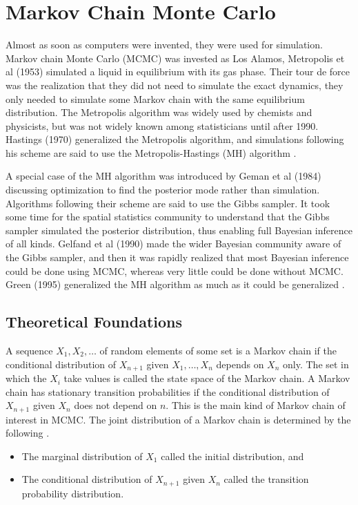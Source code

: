 \documentclass[../../../main.tex]{subfiles}
\begin{document}
\section{Markov Chain Monte Carlo}\label{Appendix:MCMC}

Almost as soon as computers were invented, they were used for simulation. Markov chain Monte Carlo (MCMC) was invested as Los Alamos, Metropolis et al (1953) simulated a liquid in equilibrium with its gas phase. Their tour de force was the realization that they did not need to simulate the exact dynamics, they only needed to simulate some Markov chain with the same equilibrium distribution. The Metropolis algorithm was widely used by chemists and physicists, but was not widely known among statisticians until after 1990. Hastings (1970) generalized the Metropolis algorithm, and simulations following his scheme are said to use the Metropolis-Hastings (MH) algorithm \autocite{Brooks2011}.

A special case of the MH algorithm was introduced by Geman et al (1984) discussing optimization to find the posterior mode rather than simulation. Algorithms following their scheme are said to use the Gibbs sampler. It took some time for the spatial statistics community to understand  that the Gibbs sampler simulated the posterior distribution, thus enabling full Bayesian inference of all kinds. Gelfand et al (1990) made the wider Bayesian community aware of the Gibbs sampler, and then it was rapidly realized that most Bayesian inference could be done using MCMC, whereas very little could be done without MCMC. Green (1995) generalized the MH algorithm as much as it could be generalized \autocite{Brooks2011}.

\subsection{Theoretical Foundations}

A sequence $X_1, X_2, \ldots$ of random elements of some set is a Markov chain if the conditional distribution of $X_{n+1}$ given $X_1,\ldots,X_n$ depends on $X_n$ only. The set in which the $X_i$ take values is called the state space of the Markov chain. A Markov chain has stationary transition probabilities if the conditional distribution of $X_{n+1}$ given $X_n$ does not depend on $n$. This is the main kind of Markov chain of interest in MCMC. The joint distribution of a Markov chain is determined by the following \autocite{Brooks2011}.

\begin{itemize}
\item The marginal distribution of $X_1$ called the initial distribution, and
\item The conditional distribution of $X_{n+1}$ given $X_n$ called the transition probability distribution.
\end{itemize}
\end{document}
